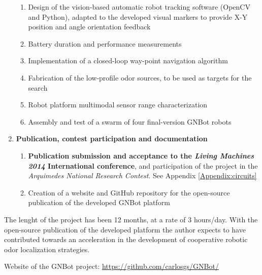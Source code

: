 \begin{enumerate}
\begin{enumerate}
		\item Design of the vision-based automatic robot tracking software (OpenCV and Python), adapted to the developed visual markers to provide X-Y position and angle orientation feedback
		\item Battery duration and performance measurements
		\item Implementation of a closed-loop way-point navigation algorithm
		\item Fabrication of the low-profile odor sources, to be used as targets for the search
		\item Robot platform multimodal sensor range characterization
		\item Assembly and test of a swarm of four final-version GNBot robots
	\end{enumerate}
	\item \textbf{Publication, contest participation and documentation}
	\begin{enumerate}
		\item \textbf{Publication submission and acceptance to the \emph{Living Machines 2014} International conference}, and participation of the project in the \emph{Arquimedes National Research Contest}. See Appendix \ref{Appendix:circuits}
		\item Creation of a website and GitHub repository for the open-source publication of the developed GNBot platform
	\end{enumerate}
\end{enumerate}
\onehalfspacing

The lenght of the project has been 12 months, at a rate of 3 hours/day. With the open-source publication of the developed platform the author expects to have contributed towards an acceleration in the development of cooperative robotic odor localization strategies.

Website of the GNBot project:  \url{https://github.com/carlosgs/GNBot/}


\newpage \thispagestyle{empty} %

